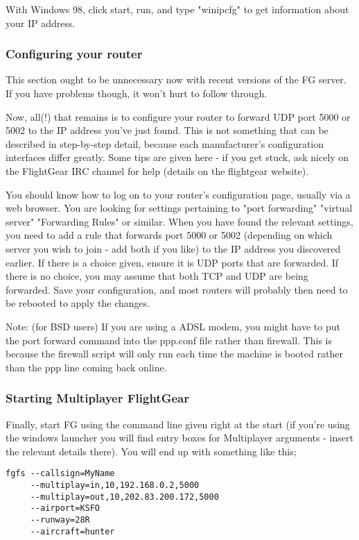 With Windows 98, click start, run, and type "winipcfg" to get information about your IP address.

\subsubsection{Configuring your router}

This section ought to be unnecessary now with recent versions of the FG server.  If you have problems though, 
it won't hurt to follow through.

Now, all(!) that remains is to configure your router to forward UDP port 5000 or 5002 to the IP address you've just found. 
This is not something that can be described in step-by-step detail, because each manufacturer's configuration interfaces 
differ greatly. Some tips are given here - if you get stuck, ask nicely on the FlightGear IRC channel for help (details 
on the flightgear website).

You should know how to log on to your router's configuration page, usually via a web browser. You are looking for settings 
pertaining to "port forwarding" "virtual server" "Forwarding Rules" or similar. When you have found the relevant settings, 
you need to add a rule that forwards port 5000 or 5002 (depending on which server you wish to join - add both if you like) 
to the IP address you discovered earlier. If there is a choice given, ensure it is UDP ports that are forwarded. If there 
is no choice, you may assume that both TCP and UDP are being forwarded. Save your configuration, and most routers will 
probably then need to be rebooted to apply the changes.

Note: (for BSD users) If you are using a ADSL modem, you might have to put the port forward command into the ppp.conf 
file rather than firewall. This is because the firewall script will only run each time the machine is booted rather 
than the ppp line coming back online.

\subsubsection{Starting Multiplayer FlightGear}

Finally, start FG using the command line given right at the start (if you're using the windows launcher you will 
find entry boxes for Multiplayer arguments - insert the relevant details there). You will end up with something like this;

\begin{verbatim}
fgfs --callsign=MyName 
     --multiplay=in,10,192.168.0.2,5000   
     --multiplay=out,10,202.83.200.172,5000 
     --airport=KSFO 
     --runway=28R   
     --aircraft=hunter 
\end{verbatim}

